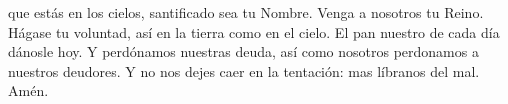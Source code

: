 que estás en los cielos, santificado sea tu Nombre. Venga a nosotros tu Reino.
Hágase tu voluntad, así en la tierra como en el cielo. El pan nuestro de cada día dánosle hoy.
Y perdónamos nuestras deuda, así como nosotros perdonamos a nuestros deudores.
Y no nos dejes caer en la tentación: mas líbranos del mal. Amén.